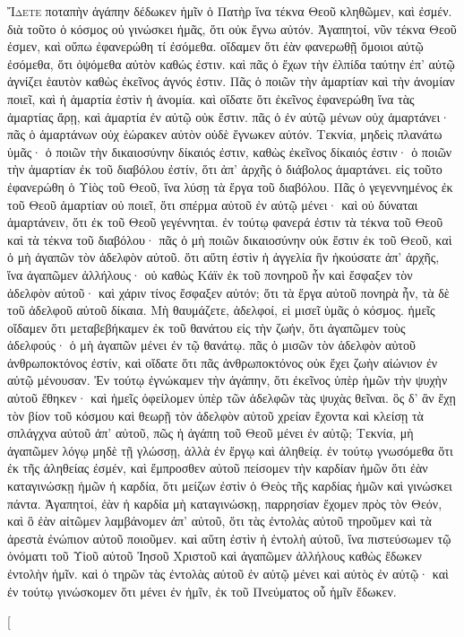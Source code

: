 \begin{pages}
    \begin{Rightside}
        \beginnumbering
		\renewcommand{\LettrineFontHook}{\PHtitl}
		\lettrine[lines=3]{Ἴ}{δετε} ποταπὴν ἀγάπην δέδωκεν ἡμῖν ὁ Πατὴρ ἵνα τέκνα Θεοῦ κληθῶμεν, καὶ ἐσμέν. διὰ τοῦτο ὁ κόσμος οὐ γινώσκει ἡμᾶς, ὅτι οὐκ ἔγνω αὐτόν. Ἀγαπητοί, νῦν τέκνα Θεοῦ ἐσμεν, καὶ οὔπω ἐφανερώθη τί ἐσόμεθα. οἴδαμεν ὅτι ἐὰν φανερωθῇ ὅμοιοι αὐτῷ ἐσόμεθα, ὅτι ὀψόμεθα αὐτὸν καθώς ἐστιν. καὶ πᾶς ὁ ἔχων τὴν ἐλπίδα ταύτην ἐπ’ αὐτῷ ἁγνίζει ἑαυτὸν καθὼς ἐκεῖνος ἁγνός ἐστιν. Πᾶς ὁ ποιῶν τὴν ἁμαρτίαν καὶ τὴν ἀνομίαν ποιεῖ, καὶ ἡ ἁμαρτία ἐστὶν ἡ ἀνομία. καὶ οἴδατε ὅτι ἐκεῖνος ἐφανερώθη ἵνα τὰς ἁμαρτίας ἄρῃ, καὶ ἁμαρτία ἐν αὐτῷ οὐκ ἔστιν. πᾶς ὁ ἐν αὐτῷ μένων οὐχ ἁμαρτάνει· πᾶς ὁ ἁμαρτάνων οὐχ ἑώρακεν αὐτὸν οὐδὲ ἔγνωκεν αὐτόν. Τεκνία, μηδεὶς πλανάτω ὑμᾶς· ὁ ποιῶν τὴν δικαιοσύνην δίκαιός ἐστιν, καθὼς ἐκεῖνος δίκαιός ἐστιν· ὁ ποιῶν τὴν ἁμαρτίαν ἐκ τοῦ διαβόλου ἐστίν, ὅτι ἀπ’ ἀρχῆς ὁ διάβολος ἁμαρτάνει. εἰς τοῦτο ἐφανερώθη ὁ Υἱὸς τοῦ Θεοῦ, ἵνα λύσῃ τὰ ἔργα τοῦ διαβόλου. Πᾶς ὁ γεγεννημένος ἐκ τοῦ Θεοῦ ἁμαρτίαν οὐ ποιεῖ, ὅτι σπέρμα αὐτοῦ ἐν αὐτῷ μένει· καὶ οὐ δύναται ἁμαρτάνειν, ὅτι ἐκ τοῦ Θεοῦ γεγέννηται. ἐν τούτῳ φανερά ἐστιν τὰ τέκνα τοῦ Θεοῦ καὶ τὰ τέκνα τοῦ διαβόλου· πᾶς ὁ μὴ ποιῶν δικαιοσύνην οὐκ ἔστιν ἐκ τοῦ Θεοῦ, καὶ ὁ μὴ ἀγαπῶν τὸν ἀδελφὸν αὐτοῦ. ὅτι αὕτη ἐστὶν ἡ ἀγγελία ἣν ἠκούσατε ἀπ’ ἀρχῆς, ἵνα ἀγαπῶμεν ἀλλήλους· οὐ καθὼς Κάϊν ἐκ τοῦ πονηροῦ ἦν καὶ ἔσφαξεν τὸν ἀδελφὸν αὐτοῦ· καὶ χάριν τίνος ἔσφαξεν αὐτόν; ὅτι τὰ ἔργα αὐτοῦ πονηρὰ ἦν, τὰ δὲ τοῦ ἀδελφοῦ αὐτοῦ δίκαια.
		\pend
		\pstart
	 	Μὴ θαυμάζετε, ἀδελφοί, εἰ μισεῖ ὑμᾶς ὁ κόσμος. ἡμεῖς οἴδαμεν ὅτι μεταβεβήκαμεν ἐκ τοῦ θανάτου εἰς τὴν ζωήν, ὅτι ἀγαπῶμεν τοὺς ἀδελφούς· ὁ μὴ ἀγαπῶν μένει ἐν τῷ θανάτῳ. πᾶς ὁ μισῶν τὸν ἀδελφὸν αὐτοῦ ἀνθρωποκτόνος ἐστίν, καὶ οἴδατε ὅτι πᾶς ἀνθρωποκτόνος οὐκ ἔχει ζωὴν αἰώνιον ἐν αὐτῷ μένουσαν. Ἐν τούτῳ ἐγνώκαμεν τὴν ἀγάπην, ὅτι ἐκεῖνος ὑπὲρ ἡμῶν τὴν ψυχὴν αὐτοῦ ἔθηκεν· καὶ ἡμεῖς ὀφείλομεν ὑπὲρ τῶν ἀδελφῶν τὰς ψυχὰς θεῖναι. ὃς δ’ ἂν ἔχῃ τὸν βίον τοῦ κόσμου καὶ θεωρῇ τὸν ἀδελφὸν αὐτοῦ χρείαν ἔχοντα καὶ κλείσῃ τὰ σπλάγχνα αὐτοῦ ἀπ’ αὐτοῦ, πῶς ἡ ἀγάπη τοῦ Θεοῦ μένει ἐν αὐτῷ; Τεκνία, μὴ ἀγαπῶμεν λόγῳ μηδὲ τῇ γλώσσῃ, ἀλλὰ ἐν ἔργῳ καὶ ἀληθείᾳ. ἐν τούτῳ γνωσόμεθα ὅτι ἐκ τῆς ἀληθείας ἐσμέν, καὶ ἔμπροσθεν αὐτοῦ πείσομεν τὴν καρδίαν ἡμῶν ὅτι ἐὰν καταγινώσκῃ ἡμῶν ἡ καρδία, ὅτι μείζων ἐστὶν ὁ Θεὸς τῆς καρδίας ἡμῶν καὶ γινώσκει πάντα. Ἀγαπητοί, ἐὰν ἡ καρδία μὴ καταγινώσκῃ, παρρησίαν ἔχομεν πρὸς τὸν Θεόν, καὶ ὃ ἐὰν αἰτῶμεν λαμβάνομεν ἀπ’ αὐτοῦ, ὅτι τὰς ἐντολὰς αὐτοῦ τηροῦμεν καὶ τὰ ἀρεστὰ ἐνώπιον αὐτοῦ ποιοῦμεν. καὶ αὕτη ἐστὶν ἡ ἐντολὴ αὐτοῦ, ἵνα πιστεύσωμεν τῷ ὀνόματι τοῦ Υἱοῦ αὐτοῦ Ἰησοῦ Χριστοῦ καὶ ἀγαπῶμεν ἀλλήλους καθὼς ἔδωκεν ἐντολὴν ἡμῖν. καὶ ὁ τηρῶν τὰς ἐντολὰς αὐτοῦ ἐν αὐτῷ μένει καὶ αὐτὸς ἐν αὐτῷ· καὶ ἐν τούτῳ γινώσκομεν ὅτι μένει ἐν ἡμῖν, ἐκ τοῦ Πνεύματος οὗ ἡμῖν ἔδωκεν.
		\pend
        \endnumbering
    \end{Rightside}
    \begin{Leftside}
        \beginnumbering
        \pstart[

\end{Leftside}
\end{pages}
